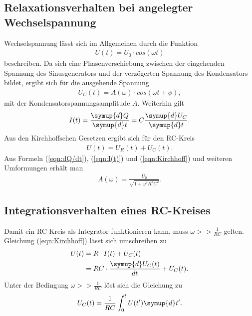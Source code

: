 \subsection{Relaxationsverhalten bei angelegter Wechselspannung}
\label{sec:RelaxationsverhaltenbeiangelegterWechselspannung}

Wechselspannung lässt sich im Allgemeinen durch die Funktion
\begin{align*}
    U(t)=U_0 \cdot cos(\omega t)
\end{align*}
beschreiben. Da sich eine Phasenverschiebung zwischen der eingehenden Spannung des Sinusgenerators und der verzögerten Spannung des Kondensators bildet,
ergibt sich für die ausgehende Spannung
\begin{align*}
    U_{C}(t)=A(\omega)\cdot cos(\omega t +\phi),
\end{align*}
mit der Kondensatorspannungsamplitude $A$. Weiterhin gilt
\begin{align}
    \label{eqn:I(t)}
    I(t)=\frac{\symup{d}Q}{\symup{d}t}=C\frac{\symup{d}U_C}{\symup{d}t}.
\end{align}
Aus den Kirchhoffschen Gesetzen ergibt sich für den RC-Kreis
\begin{align}
    \label{eqn:Kirchhoff}
    U(t)=U_{R}(t)+U_{C}(t).
\end{align}
Aus Formeln (\ref{eqn:dQ/dt}), (\ref{eqn:I(t)}) und (\ref{eqn:Kirchhoff}) und weiteren Umformungen erhält man
\begin{align}
    \label{eqn:Amplitude}
    A(\omega)=\frac{U_0}{\sqrt{1+\omega^2 R^2 C^2}}.
\end{align}

\subsection{Integrationsverhalten eines RC-Kreises}
\label{sec:IntegrationsverhalteneinesRC-Kreises}

Damit ein RC-Kreis als Integrator funktionieren kann, muss $\omega >> \frac{1}{RC}$ gelten.
Gleichung (\ref{eqn:Kirchhoff}) lässt sich umschreiben zu
\begin{align*}
    U(t)&=R \cdot I(t)+U_{C}(t)\\
        &=RC\cdot \frac{\symup{d}U_{C}(t)}{dt}+U_{C}(t).
\end{align*}
Unter der Bedingung $\omega >>\frac{1}{RC}$ löst sich die Gleichung zu
\begin{align}
    \label{eqn:Kondensatorspannung}
    U_{C}(t)=\frac{1}{RC}\int_{0}^{t} U(t')\symup{d}t'.
\end{align}
